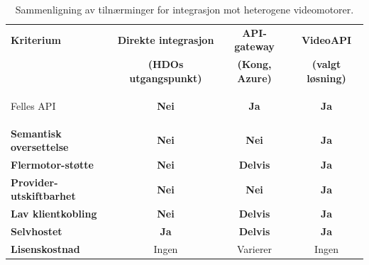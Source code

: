 \begin{table}[H]
\centering
\caption[Sammenligning av tilnærminger]{Sammenligning av tilnærminger for integrasjon mot heterogene videomotorer.}
\label{tab:eksisterende-loesninger}
\setlength{\extrarowheight}{6pt}
\small
\begin{tabularx}{\textwidth}{>{\bfseries}X c c c}

\arrayrulecolor{black}
\toprule
\rowcolor{gray!25}
\textbf{Kriterium} &
\textbf{Direkte integrasjon} &
\textbf{API-gateway} &
\textbf{VideoAPI} \\

\rowcolor{gray!25}
& \textbf{\small(HDOs utgangspunkt)} &
\textbf{\small(Kong, Azure)} &
\textbf{\small(valgt løsning)} \\
\midrule

\rowcolor{white}
Felles API &
\textcolor{red!70!black}{\textbf{Nei}} &
\textcolor{green!60!black}{\textbf{Ja}} &
\textcolor{green!60!black}{\textbf{Ja}} \\

\rowcolor{gray!10}
Semantisk oversettelse &
\textcolor{red!70!black}{\textbf{Nei}} &
\textcolor{red!70!black}{\textbf{Nei}} &
\textcolor{green!60!black}{\textbf{Ja}} \\

\rowcolor{white}
Flermotor-støtte &
\textcolor{red!70!black}{\textbf{Nei}} &
\textcolor{orange!70!black}{\textbf{Delvis}} &
\textcolor{green!60!black}{\textbf{Ja}} \\

\rowcolor{gray!10}
Provider-utskiftbarhet &
\textcolor{red!70!black}{\textbf{Nei}} &
\textcolor{red!70!black}{\textbf{Nei}} &
\textcolor{green!60!black}{\textbf{Ja}} \\

\rowcolor{white}
Lav klientkobling &
\textcolor{red!70!black}{\textbf{Nei}} &
\textcolor{orange!70!black}{\textbf{Delvis}} &
\textcolor{green!60!black}{\textbf{Ja}} \\

\rowcolor{gray!10}
Selvhostet &
\textcolor{green!60!black}{\textbf{Ja}} &
\textcolor{orange!70!black}{\textbf{Delvis}} &
\textcolor{green!60!black}{\textbf{Ja}} \\

\rowcolor{white}
Lisenskostnad &
Ingen &
Varierer &
Ingen \\

\bottomrule
\end{tabularx}


\end{table}
